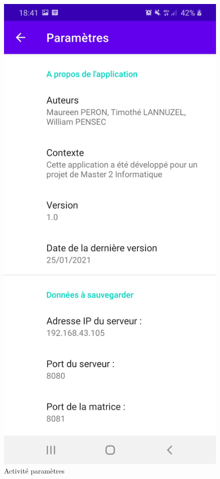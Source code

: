 \documentclass[a4paper,12pt]{report}
\begin{document}
		\begin{figure}[H]
			\centering
				\includegraphics[scale=0.2]{images/param.jpg}
				\caption{Activité paramètres}
		\end{figure}

	\clearpage
\end{document}
